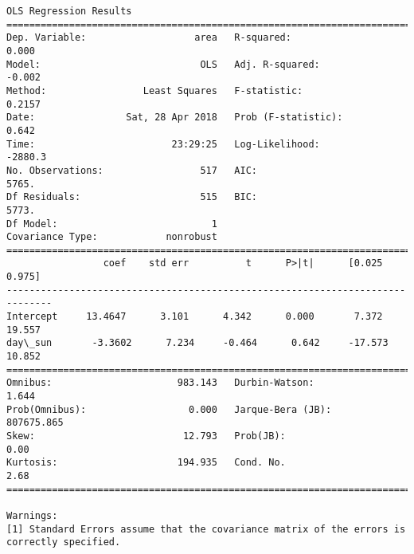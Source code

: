 \documentclass[11pt]{article}
\begin{document}
\begin{Verbatim}[commandchars=\\\{\}]
                            OLS Regression Results                            
==============================================================================
Dep. Variable:                   area   R-squared:                       0.000
Model:                            OLS   Adj. R-squared:                 -0.002
Method:                 Least Squares   F-statistic:                    0.2157
Date:                Sat, 28 Apr 2018   Prob (F-statistic):              0.642
Time:                        23:29:25   Log-Likelihood:                -2880.3
No. Observations:                 517   AIC:                             5765.
Df Residuals:                     515   BIC:                             5773.
Df Model:                           1                                         
Covariance Type:            nonrobust                                         
==============================================================================
                 coef    std err          t      P>|t|      [0.025      0.975]
------------------------------------------------------------------------------
Intercept     13.4647      3.101      4.342      0.000       7.372      19.557
day\_sun       -3.3602      7.234     -0.464      0.642     -17.573      10.852
==============================================================================
Omnibus:                      983.143   Durbin-Watson:                   1.644
Prob(Omnibus):                  0.000   Jarque-Bera (JB):           807675.865
Skew:                          12.793   Prob(JB):                         0.00
Kurtosis:                     194.935   Cond. No.                         2.68
==============================================================================

Warnings:
[1] Standard Errors assume that the covariance matrix of the errors is correctly specified.



\end{Verbatim}
\end{document}
